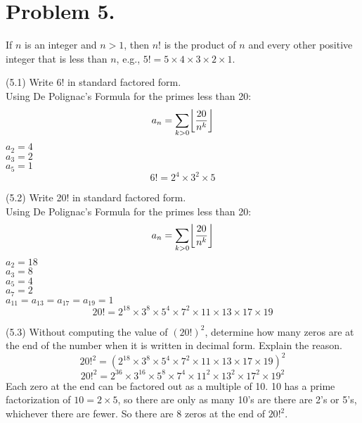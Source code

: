 \documentclass[11pt]{article}
\DeclarePairedDelimiter\floor{\lfloor}{\rfloor}
\begin{document}
\newpage


\section*{Problem 5.}

If $n$ is an integer and $n>1$, then $n!$ is the product of $n$ and every other positive integer that is less than $n$, e.g., $5!=5\times 4\times 3\times 2\times 1$.
\newline

\noindent
(5.1) Write 6! in standard factored form.\\
Using De Polignac's Formula for the primes less than 20: 
$$a_n = \sum_{k>0} \floor*{\frac{20}{n^k}}$$
$a_2 = 4$\\
$a_3 = 2$\\
$a_5 = 1$\\
\[\boxed{6! = 2^4 \times 3^2 \times 5}\]

\noindent
(5.2) Write 20! in standard factored form.\\
Using De Polignac's Formula for the primes less than 20: 
$$a_n = \sum_{k>0} \floor*{\frac{20}{n^k}}$$
$a_2 = 18$\\
$a_3 = 8$\\
$a_5 = 4$\\
$a_7 = 2$\\
$a_{11} = a_{13} = a_{17} = a_{19} = 1$
\[\boxed{20! = 2^{18} \times 3^8 \times 5^4 \times 7^2 \times 11 \times 13 \times 17 \times 19}\]


\noindent
(5.3) Without computing the value of $(20!)^2$, determine how many zeros are at the end of the number when it is written in decimal form. Explain the reason.\\

\[20!^2 = (2^{18} \times 3^8 \times 5^4 \times 7^2 \times 11 \times 13 \times 17 \times 19)^2\]
\[20!^2 = 2^{36} \times 3^{16} \times 5^8 \times 7^4 \times 11^2 \times 13^2 \times 17^2 \times 19^2\]
Each zero at the end can be factored out as a multiple of 10. 10 has a prime factorization of $10 = 2 \times 5$, so there are only as many 10's are there are 2's or 5's, whichever there are fewer. So there are $\boxed{8}$ zeros at the end of $20!^2$.
\end{document}
